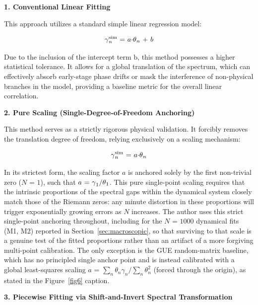 \documentclass[mca,article,submit,oneauthor,pdftex]{Definitions/mdpi}
\begin{document}
\textbf{1. Conventional Linear Fitting}

This approach utilizes a standard simple linear regression model:

\begin{equation}
\text{\ensuremath{\gamma}}_{{n}}^{\text{sim}}\text{~=~}{a}\text{\ensuremath{\cdot}}\text{\ensuremath{\theta}}_{{n}}\text{~+~}{b}
\end{equation}

Due to the inclusion of the intercept term \(\text{b}\), this method
possesses a higher statistical tolerance. It allows for a global
translation of the spectrum, which can effectively absorb early-stage
phase drifts or mask the interference of non-physical branches in the
model, providing a baseline metric for the overall linear correlation.

\textbf{2. Pure Scaling (Single-Degree-of-Freedom Anchoring)}

This method serves as a strictly rigorous physical validation. It
forcibly removes the translation degree of freedom, relying exclusively
on a scaling mechanism:

\begin{equation}
\text{\ensuremath{\gamma}}_{{n}}^{\text{sim}}\text{~=~}{a}\text{\ensuremath{\cdot}}\text{\ensuremath{\theta}}_{{n}}
\end{equation}

In its strictest form, the scaling factor \({a}\) is anchored
solely by the first non-trivial zero (\({N}\text{~=~1}\)), such
that \({a}\text{~=~}\text{\ensuremath{\gamma}}_{\text{1}}\text{/}\text{\ensuremath{\theta}}_{\text{1}}\).
This pure single-point scaling requires that the intrinsic
proportions of the spectral gaps within the dynamical system closely
match those of the Riemann zeros: any minute distortion in these
proportions will trigger exponentially growing errors as \({N}\) increases.
The author uses this strict single-point anchoring throughout, including for the
\({N}\text{~=~1000}\) dynamical fits (M1, M2) reported in
Section~\ref{sec:macroscopic}, so that surviving to that scale is a genuine
test of the fitted proportions rather than an artifact of a more
forgiving multi-point calibration. The only exception is the GUE
random-matrix baseline, which has no principled single anchor point and
is instead calibrated with a global least-squares scaling
\({a}\text{~=~}\sum_n\theta_n\gamma_n/\sum_n\theta_n^2\) (forced through
the origin), as stated in the Figure~\ref{fig6} caption.

\textbf{3. Piecewise Fitting via Shift-and-Invert Spectral
Transformation}
\end{document}
